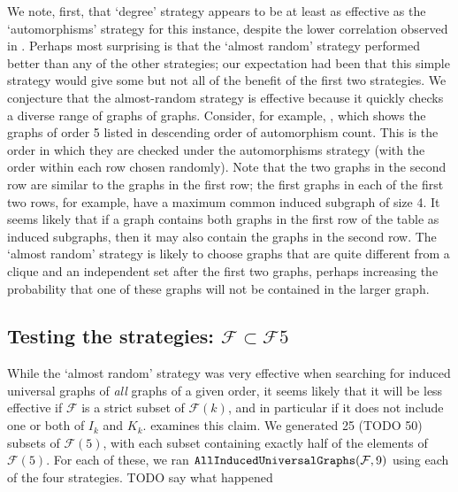 \documentclass[12pt]{article}
\newcommand{\calF}{\ensuremath{\mathcal{F}}}
\begin{document}
We note, first, that `degree' strategy appears to be at least as effective
as the `automorphisms' strategy for this instance, despite the lower
correlation observed in .  Perhaps most surprising is
that the `almost random' strategy performed better than any of the other
strategies; our expectation had been that this simple strategy would
give some but not all of the benefit of the first two strategies.
We conjecture that the almost-random strategy is effective because it
quickly checks a diverse range of graphs of graphs.  Consider, for example,
, which shows the graphs of order 5 listed
in descending order of automorphism count.  This is the order in which they
are checked under the automorphisms strategy (with the order within each
row chosen randomly).  Note that the two graphs in the second row are
similar to the graphs in the first row; the first graphs in each of the first
two rows, for example, have a maximum common induced subgraph of size 4.
It seems likely that if a graph contains both graphs in the first row of
the table as induced subgraphs, then it may also contain the graphs in the
second row. The `almost random' strategy is likely to choose graphs
that are quite different from a clique and an independent set after the first
two graphs, perhaps increasing the probability that one of these graphs
will not be contained in the larger graph.



\subsection{Testing the strategies: $\calF \subset \calF{5}$}

While the `almost random' strategy was very effective when searching
for induced universal graphs of \emph{all} graphs of a given order,
it seems likely that it will be less effective if $\calF$ is a strict
subset of $\calF(k)$, and in particular if it does not include one
or both of $I_k$ and $K_k$.  
examines this claim.  We generated 25 (TODO 50) subsets of $\calF(5)$,
with each subset containing exactly half of the elements of $\calF(5)$.
For each of these, we ran $\FuncSty{AllInducedUniversalGraphs}(\calF,9)$
using each of the four strategies.  TODO say what happened
\end{document}
